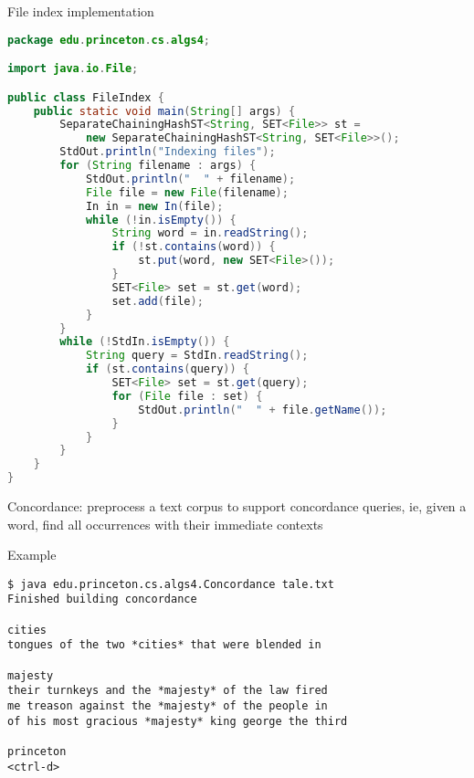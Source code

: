 \documentclass[8pt,a4paper,compress]{beamer}
\begin{document}
\begin{frame}[fragile]
\pause

File index implementation
\begin{lstlisting}[language=Java]
package edu.princeton.cs.algs4;

import java.io.File;

public class FileIndex { 
    public static void main(String[] args) {
        SeparateChainingHashST<String, SET<File>> st = 
            new SeparateChainingHashST<String, SET<File>>();
        StdOut.println("Indexing files");
        for (String filename : args) {
            StdOut.println("  " + filename);
            File file = new File(filename);
            In in = new In(file);
            while (!in.isEmpty()) {
                String word = in.readString();
                if (!st.contains(word)) { 
                    st.put(word, new SET<File>());
                }
                SET<File> set = st.get(word);
                set.add(file);
            }
        }
        while (!StdIn.isEmpty()) {
            String query = StdIn.readString();
            if (st.contains(query)) {
                SET<File> set = st.get(query);
                for (File file : set) {
                    StdOut.println("  " + file.getName());
                }
            }
        }
    }
}
\end{lstlisting}
\end{frame}

\begin{frame}[fragile]
\pause

Concordance: preprocess a text corpus to support concordance queries, ie, given a word, find all occurrences with their immediate contexts

\pause
\bigskip

Example
\begin{lstlisting}[language={}]
$ java edu.princeton.cs.algs4.Concordance tale.txt
Finished building concordance

cities
tongues of the two *cities* that were blended in

majesty
their turnkeys and the *majesty* of the law fired
me treason against the *majesty* of the people in
of his most gracious *majesty* king george the third

princeton
<ctrl-d>
\end{lstlisting}
\end{frame}
\end{document}
